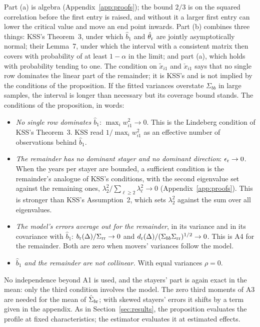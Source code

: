 Part (a) is algebra (Appendix~\ref{app:proofs}); the bound $2/3$ is on the squared correlation before the first entry is
raised, and without it a larger first entry can lower the critical value and move an end point inwards. Part (b)
combines three things: KSS's Theorem~3, under which $\hat b_1$ and $\hat\theta_{\rm r}$ are jointly asymptotically
normal; their Lemma~7, under which the interval with a consistent matrix then covers with probability of at
least $1-\alpha$ in the limit; and part (a), which holds with probability tending to one. The condition on
$\tilde x_{i1}$ and $\check x_{i1}$ says that no single row dominates the linear part of the remainder; it is
KSS's and is not implied by the conditions of the proposition. If the fitted variances overstate $\Sigma_{bb}$ in
large samples, the interval is longer than necessary but its coverage bound stands. The conditions of the
proposition, in words:
\begin{itemize}
\item \emph{No single row dominates $\hat b_1$}: $\max_iw_{i1}^2\to0$. This is the Lindeberg condition of KSS's
Theorem~3. KSS read $1/\max_iw_{i1}^2$ as an effective number of observations behind $\hat b_1$.
\item \emph{The remainder has no dominant stayer and no dominant direction}: $\epsilon_{\rm r}\to0$. When the
years per stayer are bounded, a sufficient condition is the remainder's analogue of KSS's conditions, with the
second eigenvalue set against the remaining ones, $\lambda_2^2/\sum_{\ell\ge2}\lambda_\ell^2\to0$
(Appendix~\ref{app:proofs}). This is stronger than KSS's Assumption~2, which sets $\lambda_2^2$ against the sum
over all eigenvalues.
\item \emph{The model's errors average out for the remainder}, in its variance and in its covariance with
$\hat b_1$: $b_{\rm r}(\Delta)/\Sigma_{\rm rr}\to0$ and $d_{\rm r}(\Delta)/(\Sigma_{bb}\Sigma_{\rm rr})^{1/2}\to0$. This is
A4 for the remainder. Both are zero when movers' variances follow the model.
\item \emph{$\hat b_1$ and the remainder are not collinear.} With equal variances $\rho=0$.
\end{itemize}
No independence beyond A1 is used, and the stayers' part is again exact in the mean: only the third condition
involves the model. The zero third moments of A3 are needed for the mean of $\hat\Sigma_{b{\rm r}}$; with
skewed stayers' errors it shifts by a term given in the appendix. As in Section~\ref{sec:results}, the
proposition evaluates the profile at fixed characteristics; the estimator evaluates it at estimated effects.

